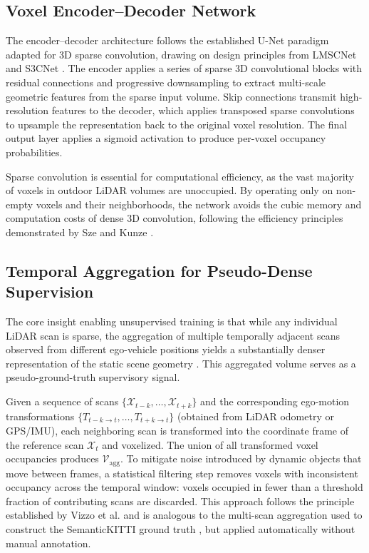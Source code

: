 \documentclass[a4paper, 12pt]{article}
\begin{document}
	\subsection{Voxel Encoder--Decoder Network}
	
	The encoder--decoder architecture follows the established U-Net paradigm
	adapted for 3D sparse convolution, drawing on design principles from LMSCNet
	\cite{9320442} and S3CNet \cite{pmlr-v155-cheng21a}. The encoder applies a
	series of sparse 3D convolutional blocks with residual connections and
	progressive downsampling to extract multi-scale geometric features from the
	sparse input volume. Skip connections transmit high-resolution features to
	the decoder, which applies transposed sparse convolutions to upsample the
	representation back to the original voxel resolution. The final output layer
	applies a sigmoid activation to produce per-voxel occupancy probabilities.
	
	Sparse convolution is essential for computational efficiency, as the vast
	majority of voxels in outdoor LiDAR volumes are unoccupied. By operating only
	on non-empty voxels and their neighborhoods, the network avoids the cubic
	memory and computation costs of dense 3D convolution, following the
	efficiency principles demonstrated by Sze and Kunze \cite{10588696}.
	
	\subsection{Temporal Aggregation for Pseudo-Dense Supervision}
	
	The core insight enabling unsupervised training is that while any individual
	LiDAR scan is sparse, the aggregation of multiple temporally adjacent scans
	observed from different ego-vehicle positions yields a substantially denser
	representation of the static scene geometry \cite{9812507}. This aggregated
	volume serves as a pseudo-ground-truth supervisory signal.
	
	Given a sequence of scans $\{\mathcal{X}_{t-k}, \ldots, \mathcal{X}_{t+k}\}$
	and the corresponding ego-motion transformations $\{T_{t-k \rightarrow t},
	\ldots, T_{t+k \rightarrow t}\}$ (obtained from LiDAR odometry or GPS/IMU),
	each neighboring scan is transformed into the coordinate frame of the
	reference scan $\mathcal{X}_t$ and voxelized. The union of all transformed
	voxel occupancies produces $\mathcal{V}_{\text{agg}}$. To mitigate noise
	introduced by dynamic objects that move between frames, a statistical
	filtering step removes voxels with inconsistent occupancy across the temporal
	window: voxels occupied in fewer than a threshold fraction of contributing
	scans are discarded. This approach follows the principle established by
	Vizzo et al. \cite{9812507} and is analogous to the multi-scan aggregation
	used to construct the SemanticKITTI ground truth \cite{Behley_2019_ICCV},
	but applied automatically without manual annotation.
	
\end{document}
